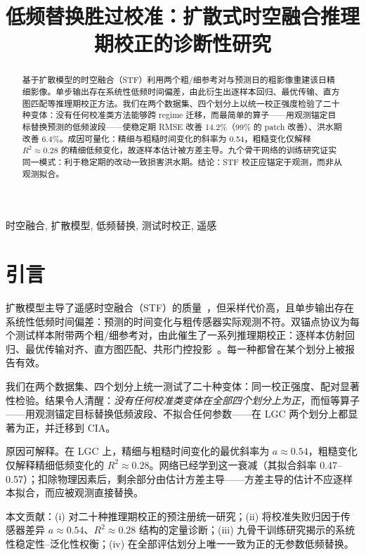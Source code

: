 \documentclass{article}
\title{低频替换胜过校准：扩散式时空融合推理期校正的诊断性研究}
\begin{document}
\ninept
\maketitle

\begin{abstract}
基于扩散模型的时空融合（STF）利用两个粗/细参考对与预测日的粗影像重建该日精细影像。单步输出存在系统性低频时间偏差，由此衍生出逐样本回归、最优传输、直方图匹配等推理期校正方法。我们在两个数据集、四个划分上以统一校正强度检验了二十种变体：没有任何校准类方法能够跨 regime 迁移，而最简单的算子——用观测锚定目标替换预测的低频波段——使稳定期 RMSE 改善 14.2\%（99\% 的 patch 改善）、洪水期改善 6.4\%。成因可量化：精细与粗糙时间变化的斜率为 0.54，粗糙变化仅解释 $R^2\approx0.28$ 的精细低频变化，故逐样本估计被方差主导。九个骨干网络的训练研究证实同一模式：利于稳定期的改动一致损害洪水期。结论：STF 校正应锚定于观测，而非从观测拟合。
\end{abstract}

\begin{keywords}
时空融合, 扩散模型, 低频替换, 测试时校正, 遥感
\end{keywords}

\section{引言}
\label{sec:intro}

扩散模型主导了遥感时空融合（STF）的质量~\cite{huang2024stfdiff,zhang2026sastf,zhu2026dpdiff}，但采样代价高，且单步输出存在系统性低频时间偏差：预测的时间变化与粗传感器实际观测不符。双锚点协议为每个测试样本附带两个粗/细参考对，由此催生了一系列推理期校正：逐样本仿射回归、最优传输对齐、直方图匹配、共形门控投影~\cite{conformal2026}。每一种都曾在某个划分上被报告有效。

我们在两个数据集、四个划分上统一测试了二十种变体：同一校正强度、配对显著性检验。结果令人清醒：\emph{没有任何校准类变体在全部四个划分上为正}，而恒等算子——用观测锚定目标替换低频波段、不拟合任何参数——在 LGC 两个划分上都显著为正，并迁移到 CIA。

原因可解释。在 LGC 上，精细与粗糙时间变化的最优斜率为 $a\approx0.54$，粗糙变化仅解释精细低频变化的 $R^2\approx0.28$。网络已经学到这一衰减（其拟合斜率 0.47–0.57）；扣除物理因素后，剩余部分由估计方差主导——方差主导的估计不应逐样本拟合，而应被观测直接替换。

本文贡献：(i) 对二十种推理期校正的预注册统一研究；(ii) 将校准失败归因于传感器差异 $a\approx0.54$、$R^2\approx0.28$ 结构的定量诊断；(iii) 九骨干训练研究揭示的系统性稳定性–泛化性权衡；(iv) 在全部评估划分上唯一一致为正的无参数低频替换。
\end{document}

